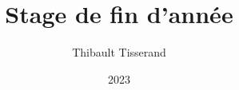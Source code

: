 \documentclass{beamer}
\title{Stage de fin d'année}
\author{Thibault Tisserand}
\institute{Université de Lille}
\date{2023}
\begin{document}
\titlepage
\end{document}
